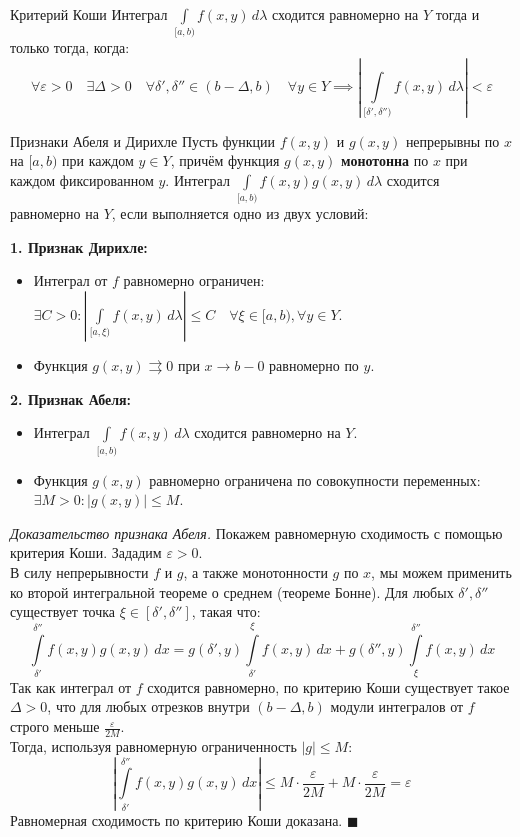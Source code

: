 \documentclass[12pt,a4paper]{article}
\newenvironment{Proof}[1][Доказательство]{\vspace{0.5em}\noindent\textit{#1.}\hspace{0.5em}\ignorespaces}{\hfill$\blacksquare$\vspace{1em}}
\begin{document}
\begin{Theorem}{Критерий Коши}{}
Интеграл $\int\limits_{[a,b)} f(x,y) \, d\lambda$ сходится равномерно на $Y$ тогда и только тогда, когда:
$$ \forall \varepsilon > 0 \quad \exists \Delta > 0 \quad \forall \delta', \delta'' \in (b-\Delta, b) \quad \forall y \in Y \implies \left| \int\limits_{[\delta', \delta'')} f(x,y) \, d\lambda \right| < \varepsilon $$
\end{Theorem}

\begin{Theorem}{Признаки Абеля и Дирихле}{}
Пусть функции $f(x,y)$ и $g(x,y)$ непрерывны по $x$ на $[a, b)$ при каждом $y \in Y$, причём функция $g(x,y)$ \textbf{монотонна} по $x$ при каждом фиксированном $y$.
Интеграл $\int\limits_{[a,b)} f(x,y)g(x,y) \, d\lambda$ сходится равномерно на $Y$, если выполняется одно из двух условий:

\textbf{1. Признак Дирихле:}
\begin{itemize}
    \item Интеграл от $f$ равномерно ограничен: $\exists C > 0 : \left| \int\limits_{[a,\xi)} f(x,y) \, d\lambda \right| \le C \quad \forall \xi \in [a, b), \forall y \in Y$.
    \item Функция $g(x,y) \rightrightarrows 0$ при $x \to b-0$ равномерно по $y$.
\end{itemize}

\textbf{2. Признак Абеля:}
\begin{itemize}
    \item Интеграл $\int\limits_{[a,b)} f(x,y) \, d\lambda$ сходится равномерно на $Y$.
    \item Функция $g(x,y)$ равномерно ограничена по совокупности переменных: $\exists M > 0 : |g(x,y)| \le M$.
\end{itemize}
\end{Theorem}

\begin{Proof}[Доказательство признака Абеля]
Покажем равномерную сходимость с помощью критерия Коши. Зададим $\varepsilon > 0$. \\
В силу непрерывности $f$ и $g$, а также монотонности $g$ по $x$, мы можем применить ко второй интегральной теореме о среднем (теореме Бонне). Для любых $\delta', \delta''$ существует точка $\xi \in [\delta', \delta'']$, такая что:
$$ \int\limits_{\delta'}^{\delta''} f(x,y) g(x,y) \, dx = g(\delta', y) \int\limits_{\delta'}^{\xi} f(x,y) \, dx + g(\delta'', y) \int\limits_{\xi}^{\delta''} f(x,y) \, dx $$
Так как интеграл от $f$ сходится равномерно, по критерию Коши существует такое $\Delta > 0$, что для любых отрезков внутри $(b-\Delta, b)$ модули интегралов от $f$ строго меньше $\frac{\varepsilon}{2M}$. \\
Тогда, используя равномерную ограниченность $|g| \le M$:
$$ \left| \int\limits_{\delta'}^{\delta''} f(x,y) g(x,y) \, dx \right| \le M \cdot \frac{\varepsilon}{2M} + M \cdot \frac{\varepsilon}{2M} = \varepsilon $$
Равномерная сходимость по критерию Коши доказана.
\end{Proof}
\end{document}
